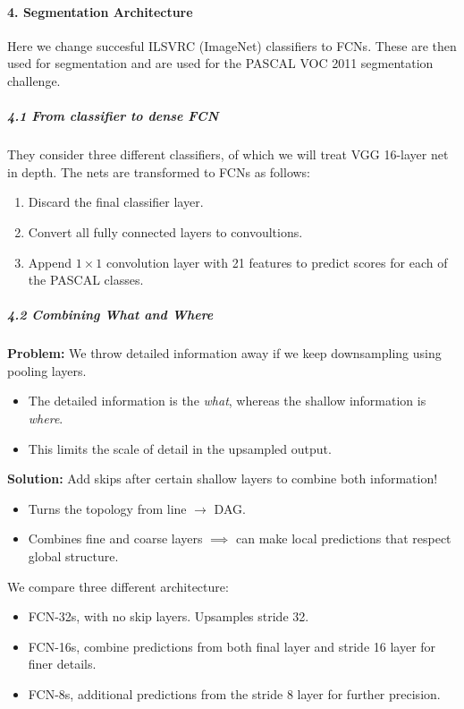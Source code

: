\documentclass[]{article}
\let\oldparagraph\paragraph
\renewcommand{\paragraph}[1]{\oldparagraph{#1}\mbox{}}
\let\oldsubparagraph\subparagraph
\renewcommand{\subparagraph}[1]{\oldsubparagraph{#1}\mbox{}}
\begin{document}
\paragraph{4. Segmentation Architecture}\label{header-n221}

Here we change succesful ILSVRC (ImageNet) classifiers to FCNs. These
are then used for segmentation and are used for the PASCAL VOC 2011
segmentation challenge.

\subparagraph{4.1 From classifier to dense FCN}\label{header-n224}

They consider three different classifiers, of which we will treat VGG
16-layer net in depth. The nets are transformed to FCNs as follows:

\begin{enumerate}
\def\labelenumi{\arabic{enumi}.}
\item
  Discard the final classifier layer.
\item
  Convert all fully connected layers to convoultions.
\item
  Append \(1 \times 1\) convolution layer with 21 features to predict
  scores for each of the PASCAL classes.
\end{enumerate}

\subparagraph{4.2 Combining What and Where}\label{header-n237}

\textbf{Problem:} We throw detailed information away if we keep
downsampling using pooling layers.

\begin{itemize}
\item
  The detailed information is the \emph{what}, whereas the shallow
  information is \emph{where}.
\item
  This limits the scale of detail in the upsampled output.
\end{itemize}

\textbf{Solution:} Add skips after certain shallow layers to combine
both information!

\begin{itemize}
\item
  Turns the topology from line \(\rightarrow\) DAG.
\item
  Combines fine and coarse layers \(\implies\) can make local
  predictions that respect global structure.
\end{itemize}

We compare three different architecture:

\begin{itemize}
\item
  FCN-32s, with no skip layers. Upsamples stride 32.
\item
  FCN-16s, combine predictions from both final layer and stride 16 layer
  for finer details.
\item
  FCN-8s, additional predictions from the stride 8 layer for further
  precision.
\end{itemize}
\end{document}
